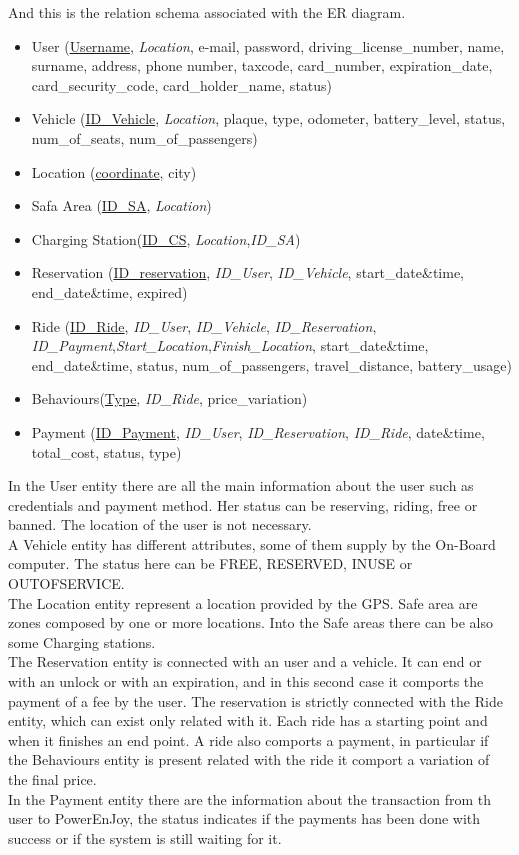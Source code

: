  And this is the relation schema associated with the ER diagram.
\begin{itemize} 
	\item{User (\underline{Username}, \textit{Location}, e-mail, password, driving\_license\_number, name, surname, address, phone number, taxcode, card\_number, expiration\_date, card\_security\_code, card\_holder\_name, status)} %
	\item{Vehicle (\underline{ID\_Vehicle}, \textit{Location}, plaque, type, odometer, battery\_level, status, num\_of\_seats, num\_of\_passengers) }
	\item{Location (\underline{coordinate}, city)}	
	\item{Safa Area (\underline{ID\_SA}, \textit{Location})} %
	\item{Charging Station(\underline{ID\_CS}, \textit{Location},\textit{ID\_SA})}
	\item{Reservation (\underline{ID\_reservation}, \textit{ID\_User}, \textit{ID\_Vehicle}, start\_date\&time, end\_date\&time, expired)}
	\item{Ride (\underline{ID\_Ride}, \textit{ID\_User}, \textit{ID\_Vehicle}, \textit{ID\_Reservation}, \textit{ID\_Payment},\textit{Start\_Location},\textit{Finish\_Location}, start\_date\&time, end\_date\&time, status, num\_of\_passengers, travel\_distance, battery\_usage)}
	\item{Behaviours(\underline{Type}, \textit{ID\_Ride}, price\_variation)}
	\item{Payment (\underline{ID\_Payment}, \textit{ID\_User}, \textit{ID\_Reservation}, \textit{ID\_Ride}, date\&time, total\_cost, status, type)}
\end{itemize}
In the User entity there are all the main information about the user such as credentials and payment method. Her status can be reserving, riding, free or banned. The location of the user is not necessary.
\\A Vehicle entity has different attributes, some of them supply by the On-Board computer. The status here can be FREE, RESERVED, INUSE or OUTOFSERVICE.
\\The Location entity represent a location provided by the GPS. Safe area are zones composed by one or more locations. Into the Safe areas there can be also some Charging stations.
\\The Reservation entity is connected with an user and a vehicle. It can end or with an unlock or with an expiration, and in this second case it comports the payment of a fee by the user. The reservation is strictly connected with the Ride entity, which can exist only related with it. Each ride has a starting point and when it finishes an end point. A ride also comports a payment, in particular if the Behaviours entity is present related with the ride it comport a variation of the final price. 
\\In the Payment entity there are the information about the transaction from th user to PowerEnJoy, the status indicates if the payments has been done with success or if the system is still waiting for it.
